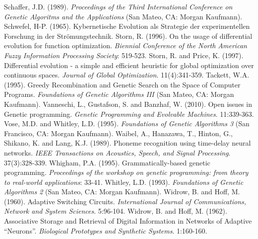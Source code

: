 \documentclass[spanish,a4paper,12pt,twoside]{report}
\begin{document}
\begin{thebibliography}{00}
   Schaffer, J.D. (1989). \emph{Proceedings of the Third International Conference on Genetic Algoritms and the Applications} (San Mateo, CA: Morgan Kaufmann).
   Schwefel, H-P. (1965). Kybernetische Evolution als Strategie der experimentellen Forschung in der Strömungstechnik.
   Storn, R. (1996). On the usage of differential evolution for function optimization. \emph{Biennial Conference of the North American Fuzzy Information Processing Society}: 519-523.
   Storn, R. and Price, K. (1997). Differential evolution - a simple and efficient heuristic for global optimization over continuous spaces. \emph{Journal of Global Optimization}. 11(4):341-359.
   Tackett, W.A. (1995). Greedy Recombination and Genetic Search on the Space of Computer Programs. \emph{Foundations of Genetic Algorithms III} (San Mateo, CA: Morgan Kaufmann).
   Vanneschi, L., Gustafson, S. and Banzhaf, W. (2010). Open issues in Genetic programming. \emph{Genetic Programming and Evolvable Machines}. 11:339-363.
   Vose, M.D. and Whitley, L.D. (1995). \emph{Foundations of Genetic Algorithms 3} (San Francisco, CA: Morgan Kaufmann).
   Waibel, A., Hanazawa, T., Hinton, G., Shikano, K. and Lang, K.J. (1989). Phoneme recognition using time-delay neural networks. \emph{IEEE Transactions on Acoustics, Speech, and Signal Processing}. 37(3):328-339.
   Whigham, P.A. (1995). Grammatically-based genetic programming. \emph{Proceedings of the workshop on genetic programming: from theory to real-world applications}: 33-41.
   Whitley, L.D. (1993). \emph{Foundations of Genetic Algorithms 2} (San Mateo, CA: Morgan Kaufmann).
   Widrow, B. and Hoff, M. (1960). Adaptive Switching Circuits. \emph{International Journal of Communications, Network and System Sciences}. 5:96-104.
   Widrow, B. and Hoff, M. (1962). Associative Storage and Retrieval of Digital Information in Networks of Adaptive “Neurons”. \emph{Biological Prototypes and Synthetic Systems}. 1:160-160.
  \end{thebibliography}
  
\end{document}
